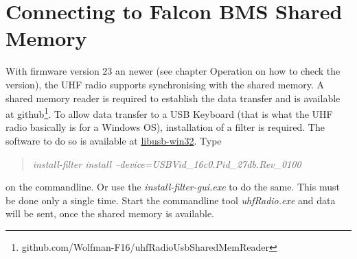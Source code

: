 \documentclass[12pt, a4paper]{report}
\begin{document}
\begin{comment}
These are not supported yet in source code and Falcon BMS
LOAD & SHF CTRL S \\
STATUS & SHF ALT CTRL S \\
Zero On & ALT CTRL A \\
Zero Off & SHF ALT CTRL A \\
Squelch On & SHF ALT X \\
Squelch Off & ALT CTRL X \\
Tone T & SHF ALT Z \\
Tone TONE & ALT CTRL Z \\
CH Vol Inc & SHF ALT CTRL Z \\
CH Vol Dec & SHF CTRL X \\
TEST & SHF ALT . \\
\end{comment}

\section {Connecting to Falcon BMS Shared Memory}

With firmware version 23 an newer (see chapter Operation on how to check the version), the UHF radio supports synchronising with the shared memory. A shared memory reader is required to establish the data transfer and is available at github\footnote{github.com/Wolfman-F16/uhfRadioUsbSharedMemReader}. 
To allow data transfer to a USB Keyboard (that is what the UHF radio basically is for a Windows OS), installation of a filter is required. 
The software to do so is available at \href{http://sourceforge.net/projects/libusb-win32/}{libusb-win32}.
Type \begin{quote}\emph{install-filter install –device=USBVid\_16c0.Pid\_27db.Rev\_0100} \end{quote} on the commandline. Or use the \emph{install-filter-gui.exe} to do the same. This must be done only a single time.
Start the commandline tool \emph{uhfRadio.exe} and data will be sent, once the shared memory is available.


\end{document}
